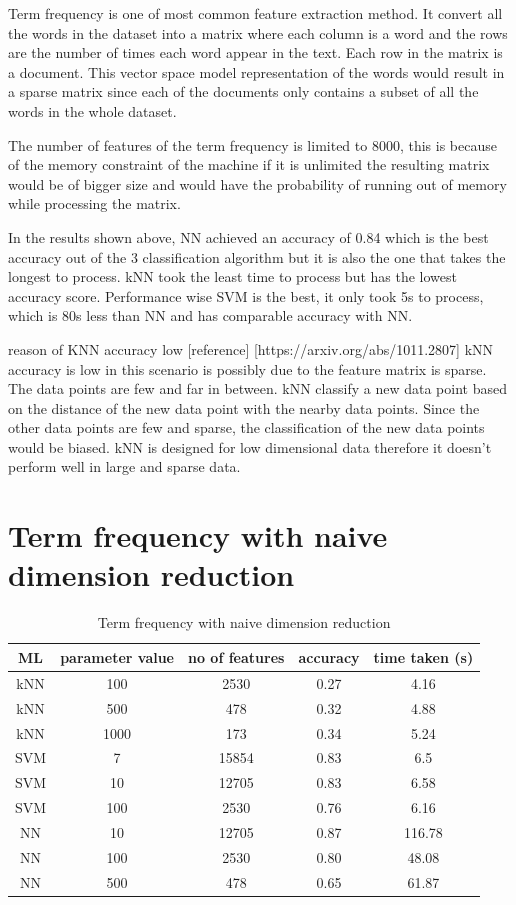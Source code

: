Term frequency is one of most common feature extraction method. It convert all the words in the dataset into a matrix where each column is a word and the rows are the number of times each word appear in the text. Each row in the matrix is a document. This vector space model representation of the words would result in a sparse matrix since each of the documents only contains a subset of all the words in the whole dataset. 

The number of features of the term frequency is limited to 8000, this is because of the memory constraint of the machine if it is unlimited the resulting matrix would be of bigger size and would have the probability of running out of memory while processing the matrix. 

In the results shown above, NN achieved an accuracy of 0.84 which is the best accuracy out of the 3 classification algorithm but it is also the one that takes the longest to process. kNN took the least time to process but has the lowest accuracy score. Performance wise SVM is the best, it only took 5s to process, which is 80s less than NN and has comparable accuracy with NN. 

reason of KNN accuracy low [reference] [https://arxiv.org/abs/1011.2807]
kNN accuracy is low in this scenario is possibly due to the feature matrix is sparse. The data points are few and far in between. kNN classify a new data point based on the distance of the new data point with the nearby data points. Since the other data points are few and sparse, the classification of the new data points would be biased. kNN is designed for low dimensional data therefore it doesn't perform well in large and sparse data.

\section{Term frequency with naive dimension reduction}

\begin{table} [ht]
	\centering
	\begin{tabular}{|| c | c | c | c | c||}
		\hline
		ML & parameter value & no of features & accuracy & time taken (s) \\ [0.5ex]
		\hline\hline
		kNN & 100 & 2530 & 0.27 & 4.16 \\ 
		\hline
		kNN & 500 & 478 & 0.32 & 4.88 \\ 
		\hline
		kNN & 1000 & 173 & 0.34 & 5.24 \\ 
		\hline\hline
		SVM & 7 & 15854 & 0.83 & 6.5 \\
		\hline
		SVM & 10 & 12705 & 0.83 & 6.58 \\
		\hline
		SVM & 100 & 2530 & 0.76 & 6.16 \\
		\hline\hline
		NN & 10 & 12705 & 0.87 & 116.78 \\
		\hline
		NN & 100 & 2530 & 0.80 & 48.08 \\
		\hline
		NN & 500 & 478 & 0.65 & 61.87 \\
		\hline\hline
	\end{tabular}
\caption{Term frequency with naive dimension reduction}
\label{tbl:termFrequencyNaive}
\end{table}

